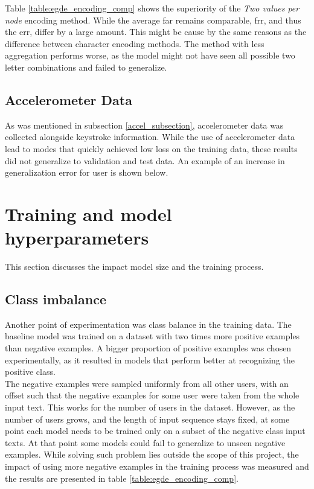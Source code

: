 Table \ref{table:egde_encoding_comp} shows the superiority of the \textit{Two values per node} encoding method. While the average far remains comparable, frr, and thus the err, differ by a large amount. This might be cause by the same reasons as the difference between character encoding methods. The method with less aggregation performs worse, as the model might not have seen all possible two letter combinations and failed to generalize.

\subsection{Accelerometer Data}
As was mentioned in subsection \ref{accel_subsection}, accelerometer data was collected alongside keystroke information. While the use of accelerometer data lead to modes that quickly achieved low loss on the training data, these results did not generalize to validation and test data. An example of an increase in generalization error for user  is shown below.

\section{Training and model hyperparameters}
This section discusses the impact model size and the training process.

\subsection{Class imbalance}
Another point of experimentation was class balance in the training data. The baseline model was trained on a dataset with two times more positive examples than negative examples. A bigger proportion of positive examples was chosen experimentally, as it resulted in models that perform better at recognizing the positive class. \\ 
The negative examples were sampled uniformly from all other users, with an offset such that the negative examples for some user were taken from the whole input text. This works for the number of users in the dataset. However, as the number of users grows, and the length of input sequence stays fixed, at some point each model needs to be trained only on a subset of the negative class input texts. At that point some models could fail to generalize to unseen negative examples. 
While solving such problem lies outside the scope of this project, the impact of using more negative examples in the training process was measured and the results are presented in table \ref{table:egde_encoding_comp}.


